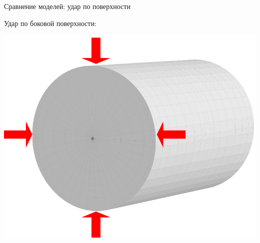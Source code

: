 \documentclass[usenames,dvipsnames]{beamer}
\begin{document}
\begin{frame}{Сравнение моделей: удар по поверхности}
\begin{minipage}{\textwidth}
	\begin{minipage}[b]{0.65\textwidth}
		\flushleft
		Удар по боковой поверхности:
	\end{minipage}
	\hfill
	\begin{minipage}[b]{0.34\textwidth}
		\includegraphics[width=\linewidth]{figures/ImpactScheme2}
	\end{minipage}
\end{minipage}


\end{frame}
\end{document}
